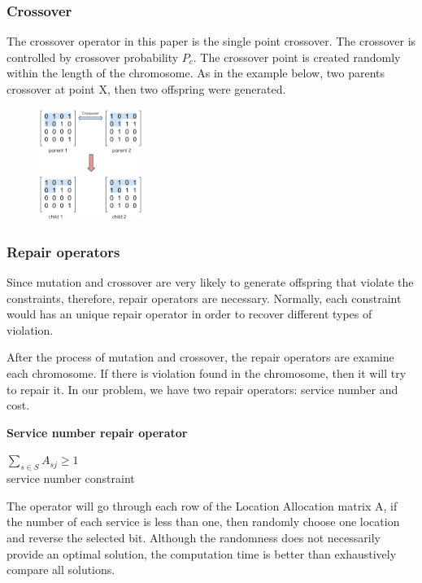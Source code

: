 \documentclass[twoside]{article}
\begin{document}
\subsubsection{Crossover}
The crossover operator in this paper is the single point crossover. 
The crossover is controlled by crossover probability $P_{c}$. 
The crossover point is created randomly within the length of the chromosome. 
As in the example below, two parents crossover at point X, then two offspring were generated.
\begin{figure}[ht]
\centering
	\includegraphics[width=0.3\textwidth]{pics/crossover.png}
\caption{}
\label{graph1}
\end{figure}


\subsubsection{Repair operators}
Since mutation and crossover are very likely to generate offspring that violate the constraints, therefore, 
repair operators are necessary. Normally, each constraint would has an unique repair operator 
in order to recover different types of violation.

After the process of mutation and crossover, the repair operators are examine each chromosome. 
If there is violation found in the chromosome, then it will try to repair it. 
In our problem, we have two repair operators: service number and cost.

\begin{flushleft}\textbf{Service number repair operator}\end{flushleft}
\begin{center}
		$\sum\limits_{s \in S} A_{sj} \geq 1$ \\
		service number constraint
\end{center}
The operator will go through each row of the Location Allocation matrix A, if the number of each 
service is less than one, then randomly choose one location and reverse the selected bit. 
Although the randomness does not necessarily provide an optimal solution, the computation time is 
better than exhaustively compare all solutions. 
\end{document}
